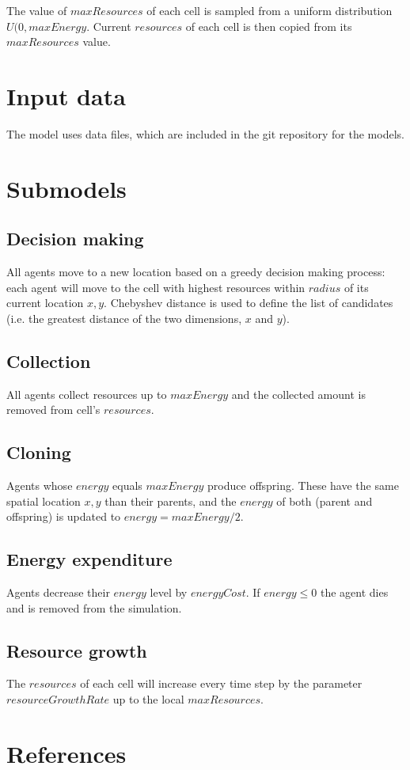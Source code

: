 \documentclass[11pt,a4paper,twocolumn,notitlepage]{article}
\begin{document}
The value of $maxResources$ of each cell is sampled from a uniform distribution $U(0,maxEnergy$. Current $resources$ of each cell is then copied from its $maxResources$ value.

\section{Input data}

The model uses data files, which are included in the git repository for the models.

\section{Submodels}

\subsection{Decision making}

All agents move to a new location based on a greedy decision making process: each agent will move to the cell with highest resources within $radius$ of its current location $x,y$. Chebyshev distance is used to define the list of candidates (i.e. the greatest distance of the two dimensions, $x$ and $y$). %

\subsection{Collection}

All agents collect resources up to $maxEnergy$ and the collected amount is removed from cell's $resources$. 

\subsection{Cloning}

Agents whose $energy$ equals $maxEnergy$ produce offspring. These have the same spatial location $x,y$ than their parents, and the $energy$ of both (parent and offspring) is updated to $energy = maxEnergy/2$.

\subsection{Energy expenditure}

Agents decrease their $energy$ level by $energyCost$. If $energy \leq 0$ the agent dies and is removed from the simulation.

\subsection{Resource growth}

The $resources$ of each cell will increase every time step by the parameter $resourceGrowthRate$ up to the local $maxResources$.

\section{References}

\end{document}
